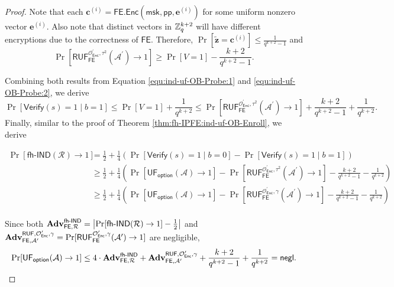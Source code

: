 \begin{proof}
\noindent Note that each $\mathbf{c}^{(i)} = \textsf{FE.Enc}(\textsf{msk}, \textsf{pp}, \mathbf{e}^{(i)})$ for some uniform nonzero vector $\mathbf{e}^{(i)}$. Also note that distinct vectors in $\mathbb{Z}_q^{k+2}$ will have different encryptions due to the correctness of $\textsf{FE}$. Therefore, $\Pr[\mathbf{\tilde{z}} = \mathbf{c}^{(i)}] \leq \frac{1}{q^{k+2} - 1}$ and
\[
	\Pr[\textsf{RUF}_\textsf{FE}^{\mathcal{O}^\prime_{\textsf{Enc}}, \tau^2}(\mathcal{A}^\prime) \to 1] \geq \Pr[V = 1] - \frac{k+2}{q^{k+2}-1}.
\]

\noindent Combining both results from Equation \ref{equ:ind-uf-OB-Probe:1} and \ref{equ:ind-uf-OB-Probe:2}, we derive
\[
	\Pr[\textsf{Verify}(s) = 1 \mid b = 1] \leq \Pr[V = 1] + \frac{1}{q^{k+2}} \leq \Pr[\textsf{RUF}_\textsf{FE}^{\mathcal{O}^\prime_{\textsf{Enc}}, \tau^2}(\mathcal{A}^\prime) \to 1] + \frac{k+2}{q^{k+2}-1} + \frac{1}{q^{k+2}}.
\]
Finally, similar to the proof of Theorem \ref{thm:fh-IPFE:ind-uf-OB-Enroll}, we derive

\begin{align*}
	\Pr[\textsf{fh-IND}(\mathcal{R}) \to 1]
	&= \frac{1}{2} + \frac{1}{4} \left( \Pr[\textsf{Verify}(s) = 1 \mid b = 0] - \Pr[\textsf{Verify}(s) = 1 \mid b = 1] \right) \\
	&\geq \frac{1}{2} + \frac{1}{4} \left( \Pr[\textsf{UF}_\textsf{option}(\mathcal{A}) \to 1] - \Pr[\textsf{RUF}_\textsf{FE}^{\mathcal{O}^\prime_{\textsf{Enc}}, \tau^2}(\mathcal{A}^\prime) \to 1] - \frac{k+2}{q^{k+2}-1} - \frac{1}{q^{k+2}} \right) \\
	&\geq \frac{1}{2} + \frac{1}{4} \left( \Pr[\textsf{UF}_\textsf{option}(\mathcal{A}) \to 1] - \Pr[\textsf{RUF}_\textsf{FE}^{\mathcal{O}^\prime_{\textsf{Enc}}, \gamma}(\mathcal{A}^\prime) \to 1] - \frac{k+2}{q^{k+2}-1} - \frac{1}{q^{k+2}} \right) \\
\end{align*}

\noindent Since both $\mathbf{Adv}_{\textsf{FE}, \mathcal{R}}^\textsf{fh-IND} = \left| \Pr[\textsf{fh-IND}(\mathcal{R}) \to 1] - \frac{1}{2} \right|$ and $\mathbf{Adv}_{\textsf{FE}, \mathcal{A}^\prime}^{\textsf{RUF}, \mathcal{O}^\prime_{\textsf{Enc}}, \gamma} = \Pr[\textsf{RUF}^{\mathcal{O}^\prime_{\textsf{Enc}}, \gamma}_{\textsf{FE}}(\mathcal{A}^\prime) \to 1 ]$ are negligible,
\[
	\Pr[\textsf{UF}_\textsf{option}(\mathcal{A}) \to 1] \leq 4 \cdot \mathbf{Adv}_{\textsf{FE}, \mathcal{R}}^\textsf{fh-IND} + \mathbf{Adv}_{\textsf{FE}, \mathcal{A}^\prime}^{\textsf{RUF}, \mathcal{O}^\prime_{\textsf{Enc}}, \gamma} + \frac{k+2}{q^{k+2}-1} + \frac{1}{q^{k+2}} = \mathsf{negl}.
\]

\end{proof}

